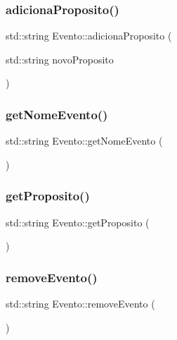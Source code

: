 \subsubsection{adiciona\+Proposito()}
{\footnotesize\ttfamily std\+::string Evento\+::adiciona\+Proposito (\begin{DoxyParamCaption}\item[{std\+::string}]{novo\+Proposito }\end{DoxyParamCaption})\hspace{0.3cm}{\ttfamily [inline]}}

\mbox{\label{class_evento_aee7dfe7bb04b1ad386417e9e930c4955}} 
\subsubsection{get\+Nome\+Evento()}
{\footnotesize\ttfamily std\+::string Evento\+::get\+Nome\+Evento (\begin{DoxyParamCaption}{ }\end{DoxyParamCaption})\hspace{0.3cm}{\ttfamily [inline]}}

\mbox{\label{class_evento_ae752162f0b1f3722df55b9b508113675}} 
\subsubsection{get\+Proposito()}
{\footnotesize\ttfamily std\+::string Evento\+::get\+Proposito (\begin{DoxyParamCaption}{ }\end{DoxyParamCaption})\hspace{0.3cm}{\ttfamily [inline]}}

\mbox{\label{class_evento_a04b30f0ffece0f361ca89b6c1eb0ed4e}} 
\subsubsection{remove\+Evento()}
{\footnotesize\ttfamily std\+::string Evento\+::remove\+Evento (\begin{DoxyParamCaption}{ }\end{DoxyParamCaption})\hspace{0.3cm}{\ttfamily [inline]}}

